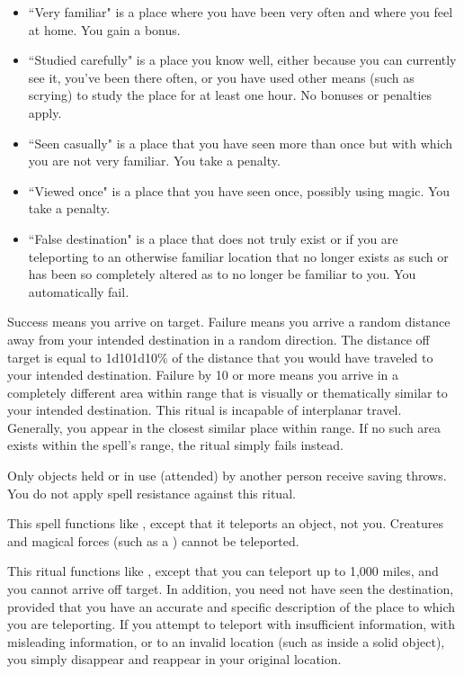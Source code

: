 \begin{itemize}
    \item ``Very familiar" is a place where you have been very often and where you feel at home. You gain a  bonus.
    \item ``Studied carefully" is a place you know well, either because you can currently see it, you've been there often, or you have used other means (such as scrying) to study the place for at least one hour. No bonuses or penalties apply.
    \item ``Seen casually" is a place that you have seen more than once but with which you are not very familiar. You take a  penalty.
    \item ``Viewed once" is a place that you have seen once, possibly using magic. You take a  penalty.
    \item ``False destination" is a place that does not truly exist or if you are teleporting to an otherwise familiar location that no longer exists as such or has been so completely altered as to no longer be familiar to you. You automatically fail.
\end{itemize}

Success means you arrive on target. Failure means you arrive a random distance away from your intended destination in a random direction. The distance off target is equal to 1d10\mult1d10\% of the distance that you would have traveled to your intended destination. Failure by 10 or more means you arrive in a completely different area within range that is visually or thematically similar to your intended destination.
\spellnotes This ritual is incapable of interplanar travel. Generally, you appear in the closest similar place within range. If no such area exists within the spell's range, the ritual simply fails instead.

Only objects held or in use (attended) by another person receive saving throws. You do not apply spell resistance against this ritual. 

\spelleffect This spell functions like , except that it teleports an object, not you. Creatures and magical forces (such as a ) cannot be teleported.

\spelleffect This ritual functions like , except that you can teleport up to 1,000 miles, and you cannot arrive off target. In addition, you need not have seen the destination, provided that you have an accurate and specific description of the place to which you are teleporting. If you attempt to teleport with insufficient information, with misleading information, or to an invalid location (such as inside a solid object), you simply disappear and reappear in your original location.

